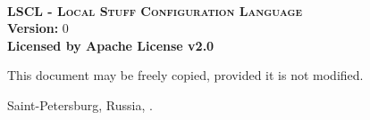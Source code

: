\begin{titlepage}
	\begin{center}
		~\\
		\vspace{5cm}
		
		\textsc{\bf \LARGE LSCL - Local Stuff Configuration Language}\\[5mm]
		
		{ \Large
			{\bf Version:} 0 \\[2mm]
			{\bf Licensed by    Apache License v2.0}
		}
		\bigskip
	\end{center}
	
	\vfill
	
	\hfill
	\begin{minipage}{0.4\linewidth}
		This document may be freely copied, provided it is not modified.
	\end{minipage}
	\vfill

	\begin{center}
		Saint-Petersburg, Russia, \the\year .
	\end{center}
\end{titlepage}
